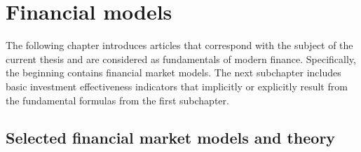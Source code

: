 \documentclass{pracamgr_wne}\usepackage[]{graphicx}\usepackage[]{color}
\begin{document}
\chapter{Financial models}





The following chapter introduces articles that correspond with the subject of the current thesis and are considered as fundamentals of modern finance.
Specifically, the beginning contains financial market models. The next subchapter includes basic investment effectiveness indicators that implicitly or explicitly result from the fundamental formulas from the first subchapter.

\section{Selected financial market models and theory}
\end{document}

